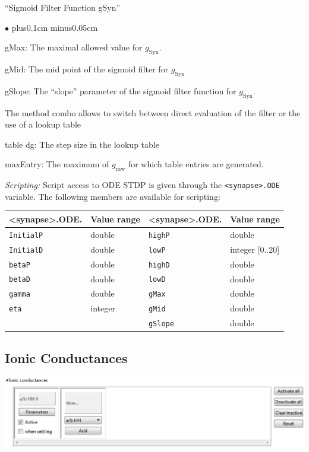 \documentclass{article}
\newenvironment{myitem}{\begin{list}{$\bullet$}{\setlength{\leftmargin}{1.1em}
\itemsep0.1cm plus0.1cm minus0.05cm
\listparindent0cm
\addtolength{\labelsep}{0.5\labelsep}
\setlength{\labelwidth}{0.8em}
\setlength{\leftmargin}{\labelwidth}
\addtolength{\leftmargin}{\labelsep}
}}{\end{list}}
\begin{document}
``Sigmoid Filter Function gSyn''
\begin{myitem}
\item gMax: The maximal allowed value for $g_{\text{Syn}}$.
\item gMid: The mid point of the sigmoid filter for $g_{\text{Syn}}$
\item gSlope: The ``slope'' parameter of the sigmoid filter function
  for $g_{\text{Syn}}$.
\item The method combo allows to switch between direct evaluation of
  the filter or the use of a lookup table
\item table dg: The step size in the lookup table
\item maxEntry: The maximum of $g_{\text{raw}}$ for which table
  entries are generated.
\end{myitem}  

\noindent
\emph{Scripting:} Script access to ODE STDP is given through the \texttt{<synapse>.ODE} variable.
The following members are available for scripting: \\
\begin{tabular}[b]{|ll|ll|}
	\hline
	{\bf \textless{}synapse\textgreater.ODE.\textvisiblespace} & {\bf Value range} 
	& {\bf \textless{}synapse\textgreater.ODE.\textvisiblespace} & {\bf Value range} \\
	\hline
	\texttt{InitialP} & double 	& \texttt{highP} & double \\
	\texttt{InitialD} & double 	& \texttt{lowP} & integer [0..20] \\
	\texttt{betaP} & double 	& \texttt{highD} & double \\
	\texttt{betaD} & double 	& \texttt{lowD} & double \\
	\texttt{gamma} & double 	& \texttt{gMax} & double \\
	\texttt{eta} & integer 		& \texttt{gMid} & double \\
					 &  		& \texttt{gSlope} & double \\
	\hline
\end{tabular}


\subsection{Ionic Conductances} \label{HHcurrents}

\parbox{\textwidth}{
  \includegraphics[scale=0.5]{HHBlock}
} \\[0.2cm]
\end{document}
